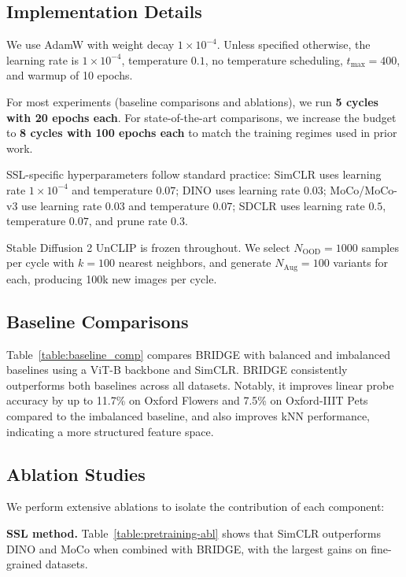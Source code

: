\documentclass{article} %
\begin{document}
\subsection{Implementation Details}

We use AdamW with weight decay $1\times10^{-4}$. Unless specified otherwise, the learning rate is $1\times10^{-4}$, temperature $0.1$, no temperature scheduling, $t_{\max}=400$, and warmup of 10 epochs.  

For most experiments (baseline comparisons and ablations), we run \textbf{5 cycles with 20 epochs each}. For state-of-the-art comparisons, we increase the budget to \textbf{8 cycles with 100 epochs each} to match the training regimes used in prior work.  

SSL-specific hyperparameters follow standard practice: SimCLR uses learning rate $1\times10^{-4}$ and temperature $0.07$; DINO uses learning rate $0.03$; MoCo/MoCo-v3 use learning rate $0.03$ and temperature $0.07$; SDCLR uses learning rate $0.5$, temperature $0.07$, and prune rate $0.3$.  

Stable Diffusion 2 UnCLIP is frozen throughout. We select $N_{\text{OOD}}=1000$ samples per cycle with $k=100$ nearest neighbors, and generate $N_{\text{Aug}}=100$ variants for each, producing 100k new images per cycle.


\subsection{Baseline Comparisons}

Table~\ref{table:baseline_comp} compares BRIDGE with balanced and imbalanced baselines using a ViT-B backbone and SimCLR. BRIDGE consistently outperforms both baselines across all datasets. Notably, it improves linear probe accuracy by up to 11.7\% on Oxford Flowers and 7.5\% on Oxford-IIIT Pets compared to the imbalanced baseline, and also improves kNN performance, indicating a more structured feature space.

\subsection{Ablation Studies}

We perform extensive ablations to isolate the contribution of each component:

\noindent\textbf{SSL method.} 
Table~\ref{table:pretraining-abl} shows that SimCLR outperforms DINO and MoCo when combined with BRIDGE, with the largest gains on fine-grained datasets.  
\end{document}
